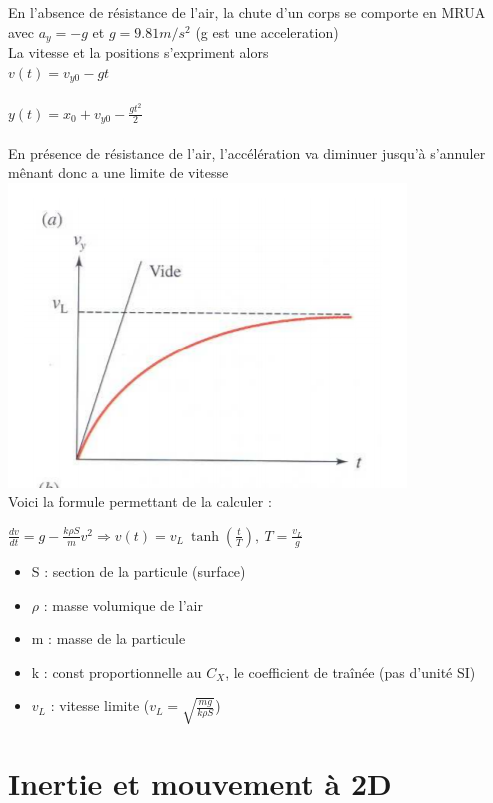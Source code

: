 \documentclass[]{article}
\begin{document}
En l'absence de résistance de l'air, la chute d'un corps se comporte en MRUA avec $a_y = -g$ et $g = 9.81m/s^2$ (g est une acceleration)\\

La vitesse et la positions s'expriment alors\\

\indent \indent $v(t) = v_{y0}-gt$\\\\
\indent \indent $y(t) = x_0 + v_{y0} -\frac{gt^2}{2}$\\\\

En présence de résistance de l'air, l'accélération va diminuer jusqu'à s'annuler mênant donc a une limite de vitesse\\
\includegraphics[scale = 0.8]{vitesse_limite}\\

Voici la formule permettant de la calculer :

\indent \indent $\frac{dv}{dt} = g-\frac{k\rho S}{m} v^2 \Rightarrow v(t) = v_L~\tanh(\frac{t}{T}),~T = \frac{v_L}{g}$

\indent \begin{itemize}
  \item S : section de la particule (surface)
  \item $\rho$ : masse volumique de l'air
  \item m : masse de la particule
  \item k : const proportionnelle au $C_X$, le coefficient de traînée (pas d'unité SI)
  \item $v_L$ : vitesse limite ($v_L = \sqrt{\frac{mg}{k\rho S}}$)
\end{itemize}
\newpage
\part{Inertie et mouvement à 2D}
\end{document}
